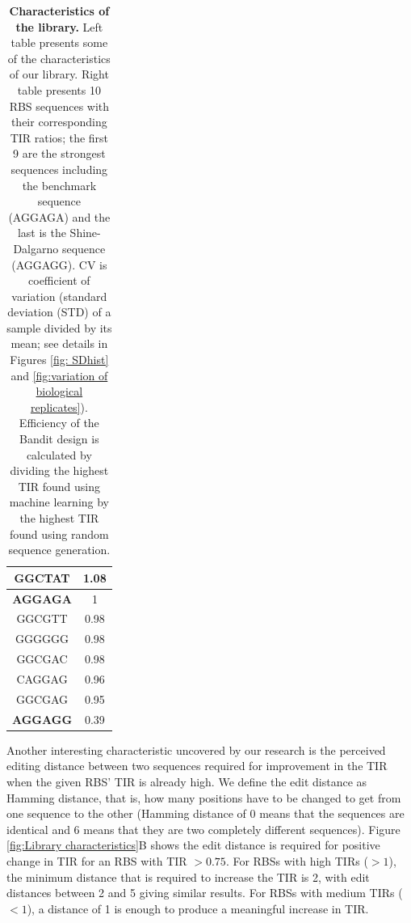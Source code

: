 \documentclass{article}
\begin{document}
\begin{table}[!h]
\begin{minipage}[c]{0.38\textwidth}
\begin{tabular}{|c|c|}
GGCTAT                & 1.08              \\ \hline
\textbf{AGGAGA}                & 1                  \\ \hline
GGCGTT                & 0.98            \\ \hline
GGGGGG                & 0.98             \\ \hline
GGCGAC                & 0.98             \\ \hline
CAGGAG                & 0.96             \\ \hline
GGCGAG                & 0.95             \\ \hline
\textbf{AGGAGG}       & 0.39            \\ \hline
\end{tabular}
\end{minipage}
\caption{\textbf{Characteristics of the library.}
Left table presents some of the characteristics of our library.
Right table presents 10 RBS sequences with their corresponding TIR ratios; the first 9 are the strongest sequences including the benchmark sequence (AGGAGA) and the last is the Shine-Dalgarno sequence (AGGAGG).
CV is coefficient of variation (standard deviation (STD) of a sample divided by its mean; see details in Figures \ref{fig: SDhist} and \ref{fig:variation of biological replicates}).
Efficiency of the Bandit design is calculated by dividing the highest TIR found using machine learning by the highest TIR found using random sequence generation.}
\end{table}

Another interesting characteristic uncovered by our research is the perceived editing distance between two sequences required for  improvement in the TIR when the given RBS' TIR is already high.
We define the edit distance as Hamming distance, that is, how many positions have to be changed to get from one sequence to the other (Hamming distance of 0 means that the sequences are identical and 6 means that they are two completely different sequences).
Figure \ref{fig:Library characteristics}B shows the edit distance is required for positive change in TIR for an RBS with TIR $>0.75$.
For RBSs with high TIRs ($>1$), the minimum distance that is required to increase the TIR is 2, with edit distances between 2 and 5 giving similar results.
For RBSs with medium TIRs ($<1$), a distance of 1 is enough to produce a meaningful increase in TIR.\\
\end{document}
